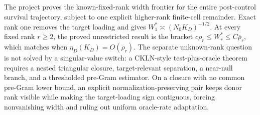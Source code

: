 The project proves the known-fixed-rank width frontier for the entire post-control survival trajectory, subject to one explicit higher-rank finite-cell remainder.  Exact rank one removes the target loading and gives \(W_1^*\asymp(N_0K_D)^{-1/2}\).  At every fixed rank \(r\ge2\), the proved unrestricted result is the bracket \(c\rho_r\le W_r^*\le C\bar\rho_r\), which matches when \(\eta_D(K_D)=O(\rho_r)\).  The separate unknown-rank question is not solved by a singular-value switch: a CKLN-style test-plus-oracle theorem requires a nested triangular closure, target-relevant separation, a near-null branch, and a thresholded pre-Gram estimator.  On a closure with no common pre-Gram lower bound, an explicit normalization-preserving pair keeps donor rank visible while making the target-loading sign contiguous, forcing nonvanishing width and ruling out uniform oracle-rate adaptation.